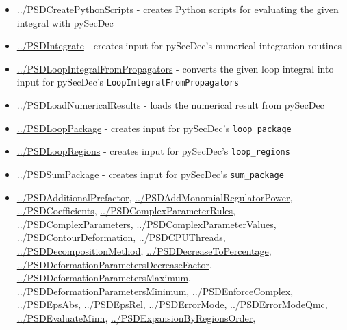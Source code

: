\documentclass[../FeynHelpersManual.tex]{subfiles}
\begin{document}
\begin{itemize}
\tightlist
\item
  \hyperlink{../psdcreatepythonscripts}{../PSDCreatePythonScripts} -
  creates Python scripts for evaluating the given integral with pySecDec
\item
  \hyperlink{../psdintegrate}{../PSDIntegrate} - creates input for
  pySecDec's numerical integration routines
\item
  \hyperlink{../psdloopintegralfrompropagators}{../PSDLoopIntegralFromPropagators}
  - converts the given loop integral into input for pySecDec's
  \texttt{LoopIntegralFromPropagators}
\item
  \hyperlink{../psdloadnumericalresults}{../PSDLoadNumericalResults} -
  loads the numerical result from pySecDec
\item
  \hyperlink{../psdlooppackage}{../PSDLoopPackage} - creates input for
  pySecDec's \texttt{loop_package}
\item
  \hyperlink{../psdloopregions}{../PSDLoopRegions} - creates input for
  pySecDec's \texttt{loop_regions}
\item
  \hyperlink{../psdsumpackage}{../PSDSumPackage} - creates input for
  pySecDec's \texttt{sum_package}
\item
  \hyperlink{../psdadditionalprefactor}{../PSDAdditionalPrefactor},
  \hyperlink{../psdaddmonomialregulatorpower}{../PSDAddMonomialRegulatorPower},
  \hyperlink{../psdcoefficients}{../PSDCoefficients},
  \hyperlink{../psdcomplexparameterrules}{../PSDComplexParameterRules},
  \hyperlink{../psdcomplexparameters}{../PSDComplexParameters},
  \hyperlink{../psdcomplexparametervalues}{../PSDComplexParameterValues},
  \hyperlink{../psdcontourdeformation}{../PSDContourDeformation},
  \hyperlink{../psdcputhreads}{../PSDCPUThreads},
  \hyperlink{../psddecompositionmethod}{../PSDDecompositionMethod},
  \hyperlink{../psddecreasetopercentage}{../PSDDecreaseToPercentage},
  \hyperlink{../psddeformationparametersdecreasefactor}{../PSDDeformationParametersDecreaseFactor},
  \hyperlink{../psddeformationparametersmaximum}{../PSDDeformationParametersMaximum},
  \hyperlink{../psddeformationparametersminimum}{../PSDDeformationParametersMinimum},
  \hyperlink{../psdenforcecomplex}{../PSDEnforceComplex},
  \hyperlink{../psdepsabs}{../PSDEpsAbs},
  \hyperlink{../psdepsrel}{../PSDEpsRel},
  \hyperlink{../psderrormode}{../PSDErrorMode},
  \hyperlink{../psderrormodeqmc}{../PSDErrorModeQmc},
  \hyperlink{../psdevaluateminn}{../PSDEvaluateMinn},
  \hyperlink{../psdexpansionbyregionsorder}{../PSDExpansionByRegionsOrder},

\end{itemize}
\end{document}

